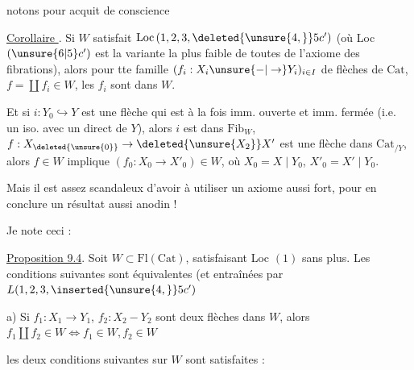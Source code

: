 
 notons pour acquit de conscience

\uline{Corollaire }. Si $W$ satisfait $\mathrm{Loc}\,(1,2,3,\deleted{\unsure{4,}}5c')$ (où Loc $(\unsure{6|5}c')$ est la variante la plus faible de toutes de l'axiome des fibrations), alors  pour tte famille $(f_i:X_i\unsure{-|\to}Y_i)_{i\in I}$ de flèches de $\mathrm{Cat}$,  $f=\coprod f_i\in W$, les $f_i$ sont dans $W$.


Et si $i:Y_0\hookrightarrow Y$ est une flèche qui est à la fois imm. ouverte et imm. fermée (i.e. un iso. avec un  direct de $Y$), alors $i$ est dans $\mathrm{Fib}_W$,   $f:X_{\deleted{\unsure{0}}}\to\deleted{\unsure{X_2}}X'$ est une flèche dans $\mathrm{Cat}_{/Y}$, alors $f\in W$ implique $(f_0:X_0\to X'_0)\in W$, où $X_0=X\mid Y_0$, $X'_0=X'\mid Y_0$.

Mais il est assez scandaleux d'avoir à utiliser un axiome aussi fort, pour en conclure un résultat aussi anodin !

Je note ceci :

\uline{Proposition 9.4}. Soit $W\subset\mathrm{Fl}(\mathrm{Cat})$, satisfaisant Loc $(1)$ sans plus. Les conditions suivantes sont équivalentes (et entraînées par $L(1,2,3,\inserted{\unsure{4,}}5c')$

a) Si $f_1:X_1\to Y_1$, $f_2:X_2-Y_2$ sont deux flèches dans $W$, alors $f_1\amalg f_2\in W\iff f_1\in W,f_2\in W$

  les deux conditions suivantes sur $W$ sont satisfaites :
